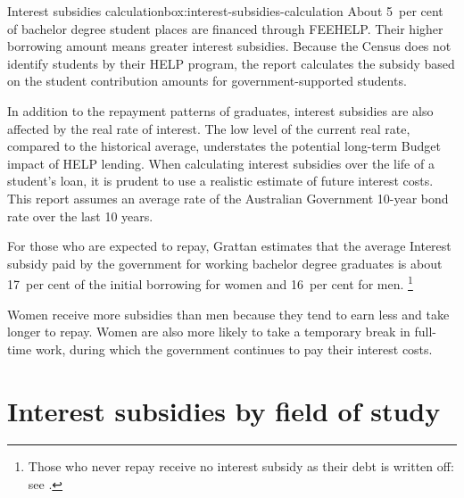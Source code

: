 \documentclass{grattan}
\begin{document}
\begin{bigbox*}{Interest subsidies calculation}{box:interest-subsidies-calculation}
About 5~per cent of bachelor degree student places are financed through \gls{FEEHELP}\@.
Their higher borrowing amount means greater interest subsidies. Because the Census does not identify students by their \gls{HELP} program, the report calculates the subsidy based on the student contribution amounts for government-supported students.

In addition to the repayment patterns of graduates, interest subsidies are also affected by the real rate of interest.
The low level of the current real rate, compared to the historical average, understates the potential long-term Budget impact of \gls{HELP} lending.
When calculating interest subsidies over the life of a student's loan, it is prudent to use a realistic estimate of future interest costs.
This report assumes an average rate of the Australian Government 10-year bond rate over the last 10 years.
\end{bigbox*}

For those who are expected to repay, Grattan estimates that the average \gls{Interest subsidy} paid by the government for working bachelor degree graduates is about 17~per cent of the initial borrowing for women and 16~per cent for men.%
   \footnote{Those who never repay receive no interest subsidy as their debt is written off: see .}

Women receive more subsidies than men because they tend to earn less and take longer to repay.
Women are also more likely to take a temporary break in full-time work, during which the government continues to pay their interest costs.

\section{Interest subsidies by field of study}\label{interest-subsidies-by-field-of-study}
\end{document}
